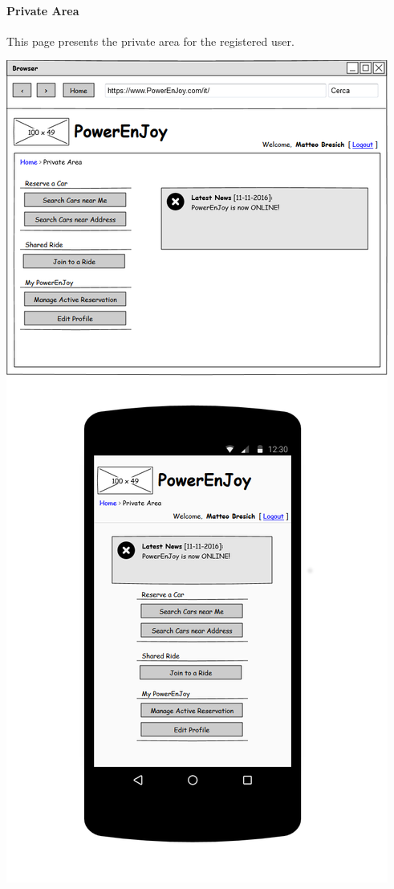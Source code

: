 \documentclass{article}
\begin{document}
			\paragraph{Private Area} This page presents the private area for the registered user.
			\begin{center}
				\includegraphics[width=0.6\linewidth]{"img/ui/private-area"}
			\end{center}
			\pagebreak
			
\end{document}
